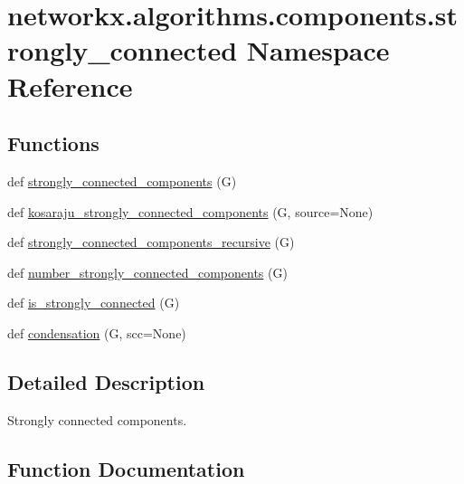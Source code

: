 \hypertarget{namespacenetworkx_1_1algorithms_1_1components_1_1strongly__connected}{}\section{networkx.\+algorithms.\+components.\+strongly\+\_\+connected Namespace Reference}
\label{namespacenetworkx_1_1algorithms_1_1components_1_1strongly__connected}
\subsection*{Functions}
\begin{DoxyCompactItemize}
\item 
def \hyperlink{namespacenetworkx_1_1algorithms_1_1components_1_1strongly__connected_a02f2798f821d78eee0d035cf82f14b3b}{strongly\+\_\+connected\+\_\+components} (G)
\item 
def \hyperlink{namespacenetworkx_1_1algorithms_1_1components_1_1strongly__connected_a52da5da8ec41ba0f6783d2a26007ca54}{kosaraju\+\_\+strongly\+\_\+connected\+\_\+components} (G, source=None)
\item 
def \hyperlink{namespacenetworkx_1_1algorithms_1_1components_1_1strongly__connected_af353ab76656c8a36fbd11da71dd74bfa}{strongly\+\_\+connected\+\_\+components\+\_\+recursive} (G)
\item 
def \hyperlink{namespacenetworkx_1_1algorithms_1_1components_1_1strongly__connected_a745e4742626183849db17f435477ad4b}{number\+\_\+strongly\+\_\+connected\+\_\+components} (G)
\item 
def \hyperlink{namespacenetworkx_1_1algorithms_1_1components_1_1strongly__connected_afc66a3236f5ff49c616cd4e79f3eb9a6}{is\+\_\+strongly\+\_\+connected} (G)
\item 
def \hyperlink{namespacenetworkx_1_1algorithms_1_1components_1_1strongly__connected_aaf47b30e2f5c50e88d873b327344c766}{condensation} (G, scc=None)
\end{DoxyCompactItemize}


\subsection{Detailed Description}
\begin{DoxyVerb}Strongly connected components.\end{DoxyVerb}
 

\subsection{Function Documentation}
\mbox{\label{namespacenetworkx_1_1algorithms_1_1components_1_1strongly__connected_aaf47b30e2f5c50e88d873b327344c766}} 
